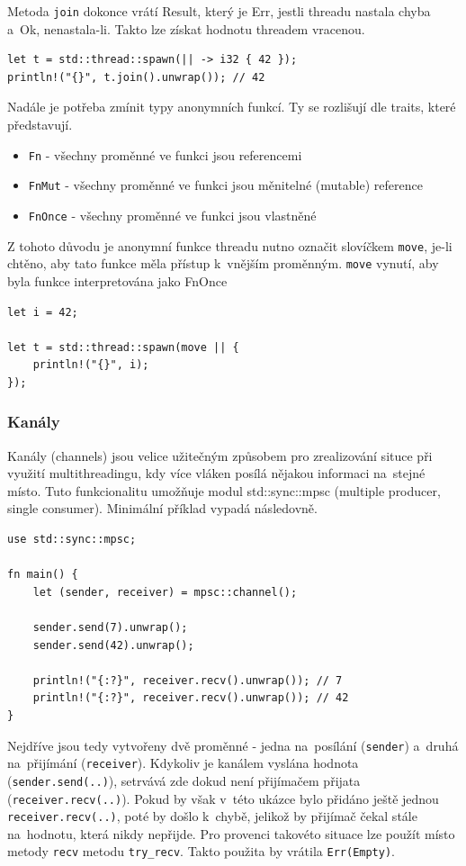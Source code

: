 \documentclass[a4paper, 12pt, twoside]{article} %
\newcommand{\rust}[1]{\texttt{#1}}
\begin{document}
		Metoda \rust{join} dokonce vrátí Result, který je Err, jestli threadu nastala chyba a~Ok, nenastala-li. Takto lze získat hodnotu threadem vracenou.
		\begin{verbatim}
let t = std::thread::spawn(|| -> i32 { 42 });
println!("{}", t.join().unwrap()); // 42
		\end{verbatim}
		
		Nadále je potřeba zmínit typy anonymních funkcí. Ty se rozlišují dle traits, které představují.
		\begin{itemize}
			\item \rust{Fn} - všechny proměnné ve funkci jsou referencemi
			\item \rust{FnMut} - všechny proměnné ve funkci jsou měnitelné (mutable) reference
			\item \rust{FnOnce} - všechny proměnné ve funkci jsou vlastněné
		\end{itemize}
		
		Z tohoto důvodu je anonymní funkce threadu nutno označit slovíčkem \rust{move}, je-li chtěno, aby tato funkce měla přístup k~vnějším proměnným. \rust{move} vynutí, aby byla funkce interpretována jako FnOnce
		\begin{verbatim}
let i = 42;

let t = std::thread::spawn(move || {
	println!("{}", i);
});
		\end{verbatim}
		
		\subsubsection*{Kanály}
			Kanály (channels) jsou velice užitečným způsobem pro zrealizování situce při využití multithreadingu, kdy více vláken posílá nějakou informaci na~stejné místo. Tuto funkcionalitu umožňuje modul std::sync::mpsc (multiple producer, single consumer). Minimální příklad vypadá následovně.
			\begin{verbatim}
use std::sync::mpsc;

fn main() {
	let (sender, receiver) = mpsc::channel();
	
	sender.send(7).unwrap();
	sender.send(42).unwrap();

	println!("{:?}", receiver.recv().unwrap()); // 7
	println!("{:?}", receiver.recv().unwrap()); // 42
}
			\end{verbatim}
			
			Nejdříve jsou tedy vytvořeny dvě proměnné - jedna na~posílání (\rust{sender}) a~druhá na~přijímání (\rust{receiver}). Kdykoliv je kanálem vyslána hodnota \linebreak(\rust{sender.send(..)}), setrvává zde dokud není přijímačem přijata \linebreak(\rust{receiver.recv(..)}). Pokud by však v~této ukázce bylo přidáno ještě jednou \rust{receiver.recv(..)}, poté by došlo k~chybě, jelikož by přijímač čekal stále na~hodnotu, která nikdy nepřijde. Pro provenci takovéto situace lze použít místo metody \rust{recv} metodu \rust{try_recv}. Takto použita by vrátila \rust{Err(Empty)}.
			
\end{document}
